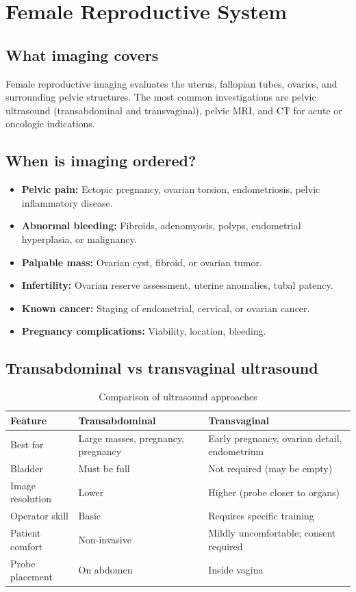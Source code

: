 \chapter{Female Reproductive System}

\label{ch:ch52_female_reproductive}

\section{What imaging covers}
Female reproductive imaging evaluates the uterus, fallopian tubes, ovaries, and surrounding pelvic structures. The most common investigations are pelvic ultrasound (transabdominal and transvaginal), pelvic MRI, and CT for acute or oncologic indications.

\section{When is imaging ordered?}
\begin{itemize}
    \item \textbf{Pelvic pain:} Ectopic pregnancy, ovarian torsion, endometriosis, pelvic inflammatory disease.
    \item \textbf{Abnormal bleeding:} Fibroids, adenomyosis, polyps, endometrial hyperplasia, or malignancy.
    \item \textbf{Palpable mass:} Ovarian cyst, fibroid, or ovarian tumor.
    \item \textbf{Infertility:} Ovarian reserve assessment, uterine anomalies, tubal patency.
    \item \textbf{Known cancer:} Staging of endometrial, cervical, or ovarian cancer.
    \item \textbf{Pregnancy complications:} Viability, location, bleeding.
\end{itemize}

\section{Transabdominal vs transvaginal ultrasound}

\begin{table}[h]
\centering
\caption{Comparison of ultrasound approaches}
\label{tab:ta_vs_tv}
\begin{tabular}{@{}p{}p{}p{}@{}}
\hline
\textbf{Feature} & \textbf{Transabdominal} & \textbf{Transvaginal} \\
\hline
Best for & Large masses, pregnancy, pregnancy & Early pregnancy, ovarian detail, endometrium \\
Bladder & Must be full & Not required (may be empty) \\
Image resolution & Lower & Higher (probe closer to organs) \\
Operator skill & Basic & Requires specific training \\
Patient comfort & Non-invasive & Mildly uncomfortable; consent required \\
Probe placement & On abdomen & Inside vagina \\
\hline
\end{tabular}
\end{table}

